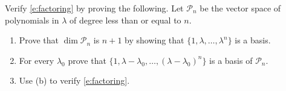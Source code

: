 \documentclass{ximera}
\begin{document}
\begin{exercise} \label{c8.2.a1}
Verify \eqref{e:factoring} by proving the following.  Let $\mathcal{P}_n$ be the vector space 
of polynomials in $\lambda$ of degree less than or equal to $n$.
\begin{enumerate}
\item Prove that $\dim\mathcal{P}_n$ is $n+1$ by showing that $\{1,\lambda,\ldots,\lambda^n\}$ 
is a basis.
\item For every $\lambda_0$ prove that $\{1, \lambda-\lambda_0, \ldots,(\lambda-\lambda_0)^n\}$ 
is a basis of $\mathcal{P}_n$.
\item Use {\rm (b)} to verify \eqref{e:factoring}.
\end{enumerate}
\end{exercise}
\end{document}
